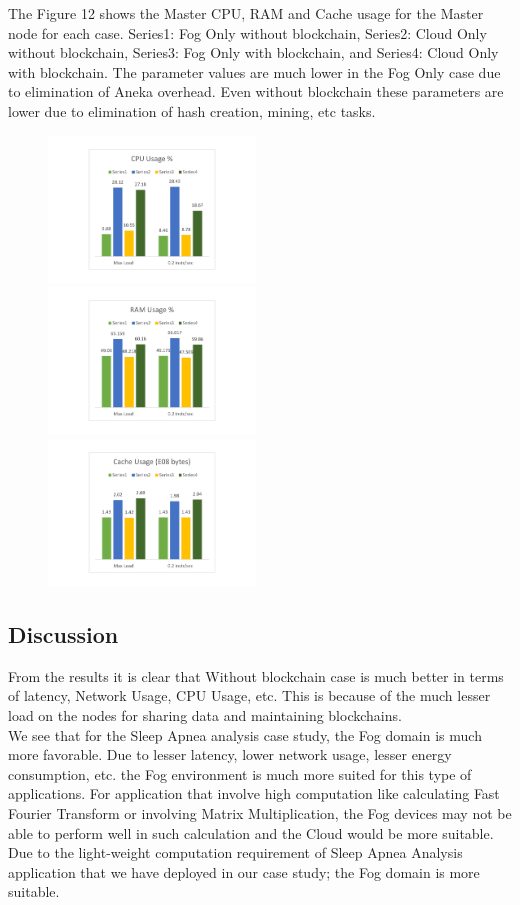 \documentclass[10pt,journal,compsoc]{IEEEtran}
\begin{document}
The Figure 12 shows the Master CPU, RAM and Cache usage for the Master node for each case. Series1: Fog Only without blockchain, Series2: Cloud Only without blockchain, Series3: Fog Only with blockchain, and Series4: Cloud Only with blockchain. The parameter values are much lower in the Fog Only case due to elimination of Aneka overhead. Even without blockchain these parameters are lower due to elimination of hash creation, mining, etc tasks.
\begin{figure}[h]
\centering
\includegraphics[width=5.5cm]{g81} \ \  
\includegraphics[width=5.5cm]{g82} \ \ 
\includegraphics[width=5.5cm]{g83}
\captionof{figure}{Master CPU Usage \%}
\end{figure}

\subsection{Discussion}

From the results it is clear that Without blockchain case is much better in terms of latency, Network Usage, CPU Usage, etc. This is because of the much lesser load on the nodes for sharing data and maintaining blockchains.\\ 
We see that for the Sleep Apnea analysis case study, the Fog domain is much more favorable. Due to lesser latency, lower network usage, lesser energy consumption, etc. the Fog environment is much more suited for this type of applications. For application that involve high computation like calculating Fast Fourier Transform or involving Matrix Multiplication, the Fog devices may not be able to perform well in such calculation and the Cloud would be more suitable. Due to the light-weight computation requirement of Sleep Apnea Analysis application that we have deployed in our case study; the Fog domain is more suitable.
\end{document}
